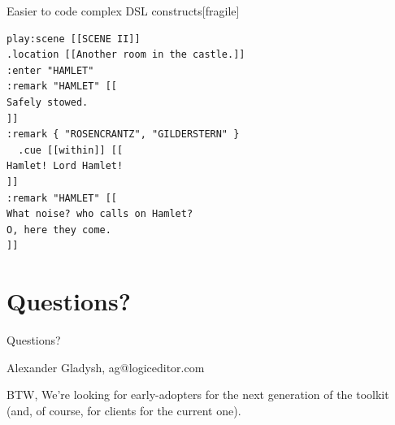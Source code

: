 \documentclass[handout]{beamer}
\begin{document}


\begin{frame}{Easier to code complex DSL constructs}[fragile]


\begin{verbatim}
play:scene [[SCENE II]]
.location [[Another room in the castle.]]
:enter "HAMLET"
:remark "HAMLET" [[
Safely stowed.
]]
:remark { "ROSENCRANTZ", "GILDERSTERN" }
  .cue [[within]] [[
Hamlet! Lord Hamlet!
]]
:remark "HAMLET" [[
What noise? who calls on Hamlet?
O, here they come.
]]
\end{verbatim}

\end{frame}


\section{Questions?}


\begin{frame}{Questions?}

Alexander Gladysh,
ag@logiceditor.com

BTW, We're looking for early-adopters for the next generation of the toolkit (and, of course, for clients for the current one).

\end{frame}

\end{document}
